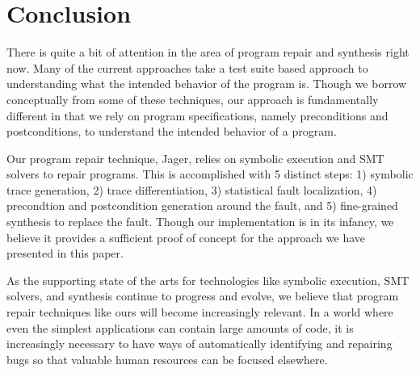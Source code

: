 \section{Conclusion}

There is quite a bit of attention in the area of program repair and
synthesis right now. Many of the current approaches take a test suite based
approach to understanding what the intended behavior of the program is.
Though we borrow conceptually from some of these techniques, our approach is
fundamentally different in that we rely on program specifications, namely
preconditions and postconditions, to understand the intended behavior of a
program.

Our program repair technique, Jager, relies on symbolic execution and SMT
solvers to repair programs. This is accomplished with 5 distinct steps: 1)
symbolic trace generation, 2) trace differentiation, 3) statistical fault
localization, 4) precondtion and postcondition generation around the fault,
and 5) fine-grained synthesis to replace the fault. Though our
implementation is in its infancy, we believe it provides a sufficient proof
of concept for the approach we have presented in this paper.

As the supporting state of the arts for technologies like symbolic
execution, SMT solvers, and synthesis continue to progress and evolve, we
believe that program repair techniques like ours will become increasingly
relevant. In a world where even the simplest applications can contain large
amounts of code, it is increasingly necessary to have ways of automatically
identifying and repairing bugs so that valuable human resources can be
focused elsewhere.
